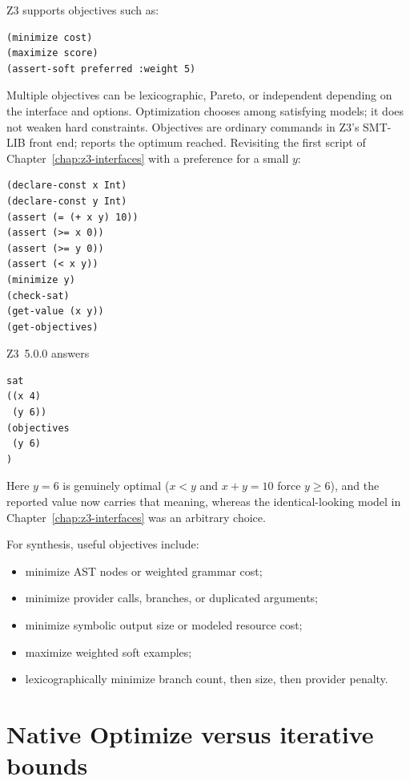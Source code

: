 \documentclass[10pt,letterpaper,oneside]{report}
\newcommand{\code}[1]{\texttt{\detokenize{#1}}}
\begin{document}
Z3 supports objectives such as:

\begin{lstlisting}[language=SMTLib]
(minimize cost)
(maximize score)
(assert-soft preferred :weight 5)
\end{lstlisting}

Multiple objectives can be lexicographic, Pareto, or independent depending on the interface and options. Optimization chooses among satisfying models; it does not weaken hard constraints.
\label{sec:opt-example}
Objectives are ordinary commands in Z3's SMT-LIB front end; \code{(get-objectives)} reports the optimum reached. Revisiting the first script of Chapter~\ref{chap:z3-interfaces} with a preference for a small $y$:

\begin{lstlisting}[language=SMTLib,caption={An optimization objective added to the hello script.}]
(declare-const x Int)
(declare-const y Int)
(assert (= (+ x y) 10))
(assert (>= x 0))
(assert (>= y 0))
(assert (< x y))
(minimize y)
(check-sat)
(get-value (x y))
(get-objectives)
\end{lstlisting}

Z3~5.0.0 answers

\begin{lstlisting}[language=SMTLib]
sat
((x 4)
 (y 6))
(objectives
 (y 6)
)
\end{lstlisting}

Here $y=6$ is genuinely optimal ($x<y$ and $x+y=10$ force $y\ge6$), and the reported value now carries that meaning, whereas the identical-looking model in Chapter~\ref{chap:z3-interfaces} was an arbitrary choice.


For synthesis, useful objectives include:

\begin{itemize}
\item minimize AST nodes or weighted grammar cost;
\item minimize provider calls, branches, or duplicated arguments;
\item minimize symbolic output size or modeled resource cost;
\item maximize weighted soft examples;
\item lexicographically minimize branch count, then size, then provider penalty.
\end{itemize}

\section{Native Optimize versus iterative bounds}
\end{document}
